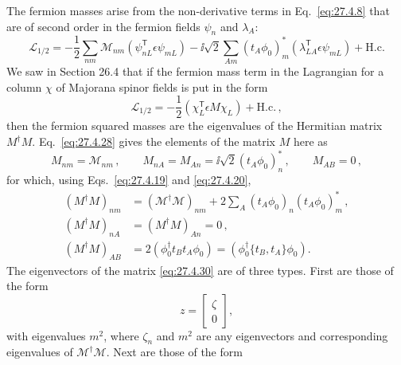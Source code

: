 The fermion masses arise from the non-derivative terms in
Eq.~\eqref{eq:27.4.8} that are of second order in the fermion fields
\(\psi_n\) and \(\lambda_A\):
\begin{equation}
  \mathcal{L}_{1/2}
  =-\frac12\sum_{nm}\mathcal{M}_{nm}
    \left(\psi_{nL}^{\mathsf T}\epsilon\psi_{mL}\right)
  -\ii\sqrt{2}\sum_{Am}(t_A\phi_0)_m^*
    \left(\lambda_{LA}^{\mathsf T}\epsilon\psi_{mL}\right)
  +\mathrm{H.c.}
  \tag{27.4.28}\label{eq:27.4.28}
\end{equation}
We saw in Section 26.4 that if the fermion mass term in the Lagrangian for a
column \(\chi\) of Majorana spinor fields is put in the form
\begin{equation}
  \mathcal{L}_{1/2}
  =-\frac12\left(\chi_L^{\mathsf T}\epsilon M\chi_L\right)
  +\mathrm{H.c.}\,,
  \tag{27.4.29}\label{eq:27.4.29}
\end{equation}
then the fermion squared masses are the eigenvalues of the Hermitian matrix
\(M^\dagger M\). Eq.~\eqref{eq:27.4.28} gives the elements of the matrix
\(M\) here as
\begin{equation}
  M_{nm}=\mathcal{M}_{nm}\,,
  \qquad
  M_{nA}=M_{An}=\ii\sqrt{2}(t_A\phi_0)_n^*\,,
  \qquad
  M_{AB}=0\,,
  \tag{27.4.30}\label{eq:27.4.30}
\end{equation}
for which, using Eqs.~\eqref{eq:27.4.19} and \eqref{eq:27.4.20},
\begin{equation}
  \begin{aligned}
  (M^\dagger M)_{nm}
  &=(\mathcal{M}^\dagger\mathcal{M})_{nm}
    +2\sum_A(t_A\phi_0)_n(t_A\phi_0)_m^*\,,
  \\
  (M^\dagger M)_{nA}
  &=(M^\dagger M)_{An}=0\,,
  \\
  (M^\dagger M)_{AB}
  &=2\left(\phi_0^\dagger t_Bt_A\phi_0\right)
   =\left(\phi_0^\dagger\{t_B,t_A\}\phi_0\right).
  \end{aligned}
  \tag{27.4.31}\label{eq:27.4.31}
\end{equation}
The eigenvectors of the matrix \eqref{eq:27.4.30} are of three types. First
are those of the form
\begin{equation}
  z=
  \begin{bmatrix}
    \zeta\\
    0
  \end{bmatrix},
  \tag{27.4.32}\label{eq:27.4.32}
\end{equation}
with eigenvalues \(m^2\), where \(\zeta_n\) and \(m^2\) are any eigenvectors
and corresponding eigenvalues of \(\mathcal{M}^\dagger\mathcal{M}\). Next
are those of the form
